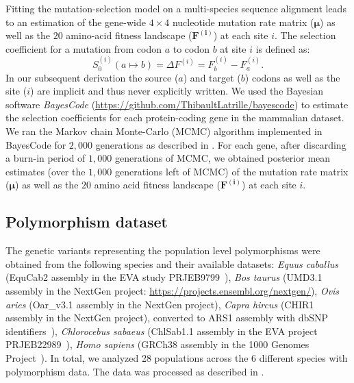 \documentclass{article}
\newcommand{\UniDimArray}[1]{\bm{#1}}
\newcommand{\Sphy}{S_{0}}
\begin{document}
    Fitting the mutation-selection model on a multi-species sequence alignment leads to an estimation of the gene-wide $4 \times 4$ nucleotide mutation rate matrix ($\UniDimArray{\mu}$) as well as the $20$ amino-acid fitness landscape ($\UniDimArray{F^{(i)}}$) at each site $i$.
    The selection coefficient for a mutation from codon $a$ to codon $b$ at site $i$ is defined as:
    \begin{equation}
        \Sphy^{(i)} (a \mapsto b) = \Delta F^{(i)} = F^{(i)}_{b} - F^{(i)}_{a}.
    \end{equation}
    In our subsequent derivation the source ($a$) and target ($b$) codons as well as the site ($i$) are implicit and thus never explicitly written.
    We used the Bayesian software \textit{BayesCode} (\url{https://github.com/ThibaultLatrille/bayescode}) to estimate the selection coefficients for each protein-coding gene in the mammalian dataset.
    We ran the Markov chain Monte-Carlo (MCMC) algorithm implemented in BayesCode for $2,000$ generations as described in \textcite{latrille_genes_2023}.
    For each gene, after discarding a burn-in period of $1,000$ generations of MCMC, we obtained posterior mean estimates (over the $1,000$ generations left of MCMC) of the mutation rate matrix ($\UniDimArray{\mu}$) as well as the $20$ amino acid fitness landscape ($\UniDimArray{F^{(i)}}$) at each site $i$.

    \subsection{Polymorphism dataset}
    \label{subsec:polymorphism-dataset}

    The genetic variants representing the population level polymorphisms were obtained from the following species and their available datasets: \textit{Equus caballus} (EquCab2 assembly in the EVA study PRJEB9799~\cite{alabri_whole_2020}), \textit{Bos taurus} (UMD3.1 assembly in the NextGen project: \url{https://projects.ensembl.org/nextgen/}), \textit{Ovis aries} (Oar\_v3.1 assembly in the NextGen project), \textit{Capra hircus} (CHIR1 assembly in the NextGen project), converted to ARS1 assembly with dbSNP identifiers~\cite{sherry_dbsnp_2001}), \textit{Chlorocebus sabaeus} (ChlSab1.1 assembly in the EVA project PRJEB22989~\cite{svardal_ancient_2017}), \textit{Homo sapiens} (GRCh38 assembly in the 1000 Genomes Project~\cite{zheng-bradley_alignment_2017}).
    In total, we analyzed 28 populations across the 6 different species with polymorphism data.
    The data was processed as described in \textcite{latrille_genes_2023}.
\end{document}

